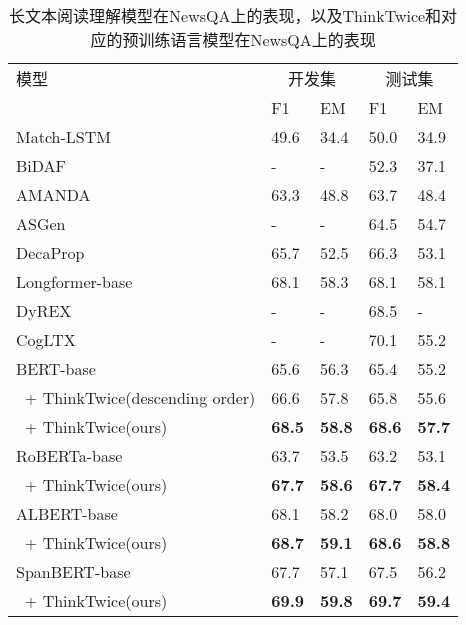 \begin{table}[htbp]
    \centering
    \caption{长文本阅读理解模型在NewsQA上的表现，以及ThinkTwice和对应的预训练语言模型在NewsQA上的表现}
    \begin{tabular}{lp{24pt}<{\centering}p{24pt}<{\centering}p{24pt}<{\centering}p{24pt}<{\centering}}
         \hline
         {模型} & \multicolumn{2}{c}{开发集} & \multicolumn{2}{c}{测试集} \\
         & {F1} & {EM} & {F1} & {EM} \\
         \hline
         Match-LSTM~\cite{wang2015learning} & 49.6 & 34.4 & 50.0 & 34.9 \\
         BiDAF~\cite{seo2016bidirectional} & - & - & 52.3 & 37.1 \\
         AMANDA~\cite{kundu2018question} & 63.3 & 48.8 & 63.7 & 48.4 \\
         ASGen~\cite{Back2021LearningTG} & - & - & 64.5 & 54.7 \\
         DecaProp~\cite{tay2018densely} & 65.7 & 52.5 & 66.3 & 53.1 \\
         Longformer-base~\cite{beltagy2020longformer} & 68.1 & 58.3 & 68.1 & 58.1 \\
         DyREX~\cite{Zaratiana2022DyRExDQ} & - & - & 68.5 & - \\
         CogLTX~\cite{ding2020cogltx} & - & - & 70.1 & 55.2 \\
         \hline
         BERT-base~\cite{devlin2018bert} & 65.6 & 56.3 & 65.4 & 55.2 \\
         $\ $ + ThinkTwice(descending order) & 66.6 & 57.8 & 65.8 & 55.6 \\
         $\ $ + ThinkTwice(ours) & {\bfseries 68.5} & {\bfseries 58.8} & {\bfseries 68.6} & {\bfseries 57.7} \\
         \hline
         RoBERTa-base~\cite{liu2019roberta} & 63.7 & 53.5 & 63.2 & 53.1 \\
         $\ $ + ThinkTwice(ours) & {\bfseries 67.7} & {\bfseries 58.6} & {\bfseries 67.7} & {\bfseries 58.4} \\
         \hline
         ALBERT-base~\cite{lan2019albert} & 68.1 & 58.2 & 68.0 & 58.0 \\
         $\ $ + ThinkTwice(ours) & {\bfseries 68.7} & {\bfseries 59.1} & {\bfseries 68.6} & {\bfseries 58.8} \\
         \hline
         SpanBERT-base~\cite{joshi2020spanbert} & 67.7 & 57.1 & 67.5 & 56.2 \\
         $\ $ + ThinkTwice(ours) & {\bfseries 69.9} & {\bfseries 59.8} & {\bfseries 69.7} & {\bfseries 59.4} \\

\end{tabular}
\end{table}
